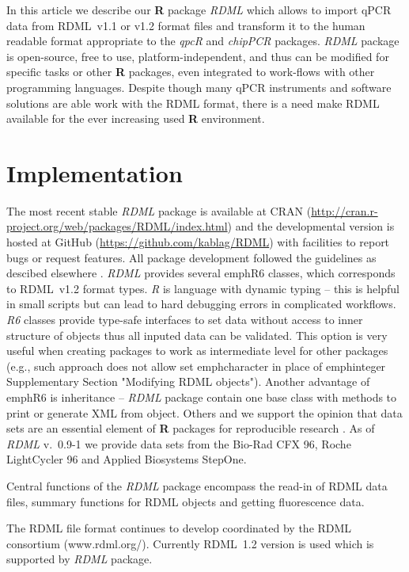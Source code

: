 \documentclass{bioinfo}
\begin{document}
In this article we describe our \textbf{R} package \textit{RDML} which allows to 
import qPCR data from RDML~v1.1 or v1.2 format files and transform it to the human 
readable format appropriate to the \textit{qpcR} and \textit{chipPCR} packages. 
\textit{RDML} package is open-source, free to use, platform-independent, and 
thus can be modified for specific tasks or other \textbf{R} packages, even 
integrated to work-flows with other programming languages. Despite though many qPCR 
instruments and software solutions are able work with the RDML format, there is 
a need make RDML available for the ever increasing used \textbf{R} environment.

\section{Implementation}

The most recent stable \textit{RDML} package is available at CRAN 
(\url{http://cran.r-project.org/web/packages/RDML/index.html}) and the 
developmental version is hosted at GitHub (\url{https://github.com/kablag/RDML}) 
with facilities to report bugs or request features. All package development 
followed the guidelines as descibed elsewhere \cite{RDCT2014a}. \textit{RDML} provides several emph{R6} classes, which corresponds to RDML~v1.2 format types. \emph{R} is language with dynamic typing -- this is helpful in small scripts but can lead to hard debugging errors in complicated workflows. \emph{R6} classes provide type-safe interfaces to set data without access to inner structure of objects thus all inputed data can be validated. This option is very useful when creating packages to work as intermediate level for other packages (e.g., such approach does not allow set emph{character} in place of emph{integer} Supplementary Section "Modifying RDML objects"). Another advantage of emph{R6} is inheritance -- \textit{RDML} package contain one base class with methods to print or generate XML from object. Others and we support the opinion that data sets are an essential element of \textbf{R} 
packages for reproducible research 
\cite{gentleman_2004,hofmann_2013,Leeper_2014}. As 
of \textit{RDML} v.~0.9-1 we provide data sets from the Bio-Rad CFX 96, Roche LightCycler 96 and Applied Biosystems StepOne.

Central functions of the \textit{RDML} package encompass the read-in of RDML 
data files, summary functions for RDML objects and getting fluorescence data.

The RDML file format continues to develop coordinated by the RDML consortium 
(www.rdml.org/). Currently RDML~1.2 version is used which is supported by \textit{RDML} package.
\end{document}
